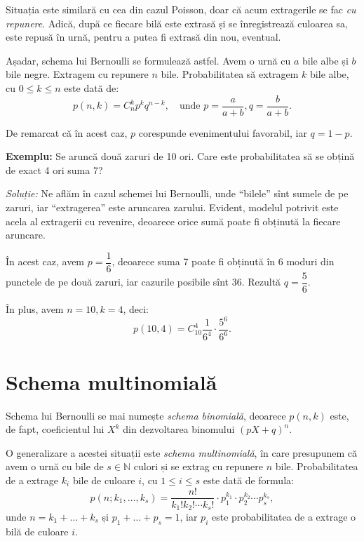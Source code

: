 \documentclass[12pt,a4paper]{article}
\newcommand\qq{\enquote}
\newcommand\NN{\mathbb{N}}
\theoremstyle{dotless}
\theoremstyle{dotlessdr}
\begin{document}
\indent\indent Situația este similară cu cea din cazul Poisson, doar că acum
extragerile se fac \emph{cu repunere}. Adică, după ce fiecare bilă este extrasă
și se înregistrează culoarea sa, este repusă în urnă, pentru a putea fi extrasă din
nou, eventual.

Așadar, schema lui Bernoulli se formulează astfel. Avem o urnă cu $ a $ bile albe
și $ b $ bile negre. Extragem cu repunere $ n $ bile. Probabilitatea să extragem
$ k $ bile albe, cu $ 0 \leq k \leq n $ este dată de:
\[
  p(n, k) = C_n^k p^k q^{n-k}, \quad \text{unde } p = \frac{a}{a + b}, %
  q = \frac{b}{a + b}.
\]

De remarcat că în acest caz, $ p $ corespunde evenimentului favorabil, iar $ q = 1 - p $.

\vspace{1cm}

\textbf{Exemplu:} Se aruncă două zaruri de 10 ori. Care este probabilitatea să se obțină
de exact 4 ori suma 7?

\emph{Soluție:} Ne aflăm în cazul schemei lui Bernoulli, unde \qq{bilele} sînt sumele
de pe zaruri, iar \qq{extragerea} este aruncarea zarului. Evident, modelul potrivit
este acela al extragerii cu revenire, deoarece orice sumă poate fi obținută la fiecare
aruncare.

În acest caz, avem $ p = \dfrac{1}{6} $, deoarece suma 7 poate fi obținută în 6 moduri
din punctele de pe două zaruri, iar cazurile posibile sînt 36. Rezultă $ q = \dfrac{5}{6} $.

În plus, avem $ n = 10, k = 4 $, deci:
\[
  p(10, 4) = C_{10}^4 \frac{1}{6^4} \cdot \frac{5^6}{6^6}.
\]


\section*{Schema multinomială}

\indent\indent Schema lui Bernoulli se mai numește \emph{schema binomială},
deoarece $ p(n, k) $ este, de fapt, coeficientul lui $ X^k $ din dezvoltarea
binomului $ (pX + q)^n $.

O generalizare a acestei situații este \emph{schema multinomială}, în care
presupunem că avem o urnă cu bile de $ s \in \NN $ culori și se extrag cu
repunere $ n $ bile. Probabilitatea de a extrage $ k_i $ bile de culoare
$ i $, cu $ 1 \leq i \leq s $ este dată de formula:
\[
  p(n; k_1, \dots, k_s) = \frac{n!}{k_1! k_2! \cdots k_s!} \cdot %
  p_1^{k_1} \cdot p_2^{k_2} \cdots p_s^{k_s},
\]
unde $ n = k_1 + \dots + k_s $ și $ p_1 + \dots + p_s = 1 $, iar
$ p_i $ este probabilitatea de a extrage o bilă de culoare $ i $.
\end{document}
